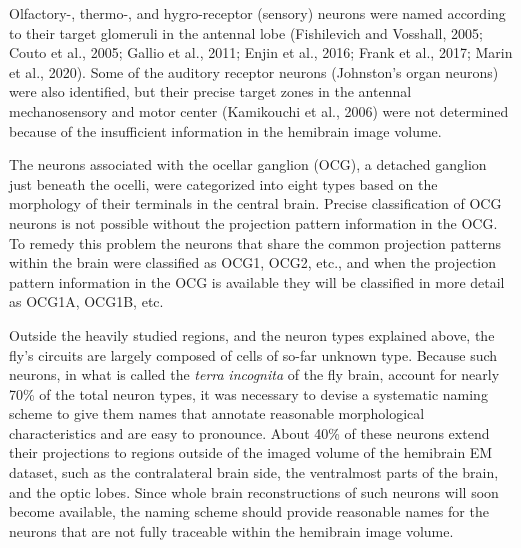 \documentclass{article}
\begin{document}
Olfactory-, thermo-, and hygro-receptor (sensory) neurons were named according to their target glomeruli in the antennal lobe (Fishilevich and Vosshall, 2005; Couto et al., 2005; Gallio et al., 2011; Enjin et al., 2016; Frank et al., 2017; Marin et al., 2020). Some of the auditory receptor neurons (Johnston’s organ neurons) were also identified, but their precise target zones in the antennal mechanosensory and motor center (Kamikouchi et al., 2006) were not determined because of the insufficient information in the hemibrain image volume.

The neurons associated with the ocellar ganglion (OCG), a detached ganglion just beneath the ocelli, were categorized into eight types based on the morphology of their terminals in the central brain. Precise classification of OCG neurons is not possible without the projection pattern information in the OCG. To remedy this problem the neurons that share the common projection patterns within the brain were classified as OCG1, OCG2, etc., and when the projection pattern information in the OCG is available they will be classified in more detail as OCG1A, OCG1B, etc.

Outside the heavily studied regions, and the neuron types explained above, the fly’s circuits are largely composed of cells of so-far unknown type. Because such neurons, in what is called the \emph{terra} \emph{incognita} of the fly brain, account for nearly 70\% of the total neuron types, it was necessary to devise a systematic naming scheme to give them names that annotate reasonable morphological characteristics and are easy to pronounce. About 40\% of these neurons extend their projections to regions outside of the imaged volume of the hemibrain EM dataset, such as the contralateral brain side, the ventralmost parts of the brain, and the optic lobes. Since whole brain reconstructions of such neurons will soon become available, the naming scheme should provide reasonable names for the neurons that are not fully traceable within the hemibrain image volume.
\end{document}
